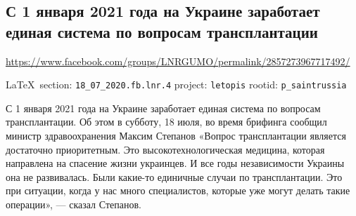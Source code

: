  
 
\subsection{С 1 января 2021 года на Украине заработает единая система по вопросам
трансплантации}
\url{https://www.facebook.com/groups/LNRGUMO/permalink/2857273967717492/}
  
\vspace{0.5cm}
{\small\LaTeX~section: \verb|18_07_2020.fb.lnr.4| project: \verb|letopis| rootid: \verb|p_saintrussia|}
\vspace{0.5cm}

С 1 января 2021 года на Украине заработает единая система по вопросам
трансплантации. Об этом в субботу, 18 июля, во время брифинга сообщил министр
здравоохранения Максим Степанов «Вопрос трансплантации является достаточно
приоритетным. Это высокотехнологическая медицина, которая направлена на
спасение жизни украинцев. И все годы независимости Украины она не развивалась.
Были какие-то единичные случаи по трансплантации. Это при ситуации, когда у нас
много специалистов, которые уже могут делать такие операции», --- сказал
Степанов.  
